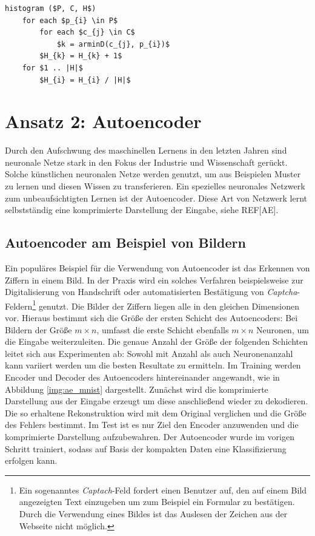 
\begin{lstlisting}[mathescape=true]
histogram ($P, C, H$)
	for each $p_{i} \in P$
		for each $c_{j} \in C$
			$k = arminD(c_{j}, p_{i})$ 
		$H_{k} = H_{k} + 1$		
	for $1 .. |H|$
		$H_{i} = H_{i} / |H|$
\end{lstlisting}

\section{Ansatz 2: Autoencoder}

Durch den Aufschwung des maschinellen Lernens in den letzten Jahren sind neuronale Netze stark in den Fokus der Industrie und Wissenschaft gerückt. Solche künstlichen neuronalen Netze werden genutzt, um aus Beispielen Muster zu lernen und diesen Wissen zu transferieren. 
Ein spezielles neuronales Netzwerk zum unbeaufsichtigten Lernen ist der Autoencoder. Diese Art von Netzwerk lernt selbstständig eine komprimierte Darstellung der Eingabe, siehe REF[AE].

\subsection{Autoencoder am Beispiel von Bildern}

Ein populäres Beispiel für die Verwendung von Autoencoder ist das Erkennen von Ziffern in einem Bild. In der Praxis wird ein solches Verfahren beispielsweise zur Digitalisierung von Handschrift oder automatisierten Bestätigung von \textit{Captcha}-Feldern\footnote{Ein sogenanntes \textit{Captach}-Feld fordert einen Benutzer auf, den auf einem Bild angezeigten Text einzugeben um zum Beispiel ein Formular zu bestätigen. Durch die Verwendung eines Bildes ist das Auslesen der Zeichen aus der Webseite nicht möglich.} genutzt.
Die Bilder der Ziffern liegen alle in den gleichen Dimensionen vor. Hieraus bestimmt sich die Größe der ersten Schicht des Autoencoders: Bei Bildern der Größe $m \times n$, umfasst die erste Schicht ebenfalls $m \times n$ Neuronen, um die Eingabe weiterzuleiten. Die genaue Anzahl der Größe der folgenden Schichten leitet sich aus Experimenten ab: Sowohl mit Anzahl als auch Neuronenanzahl kann variiert werden um die besten Resultate zu ermitteln.
Im Training werden Encoder und Decoder des Autoencoders hintereinander angewandt, wie in Abbildung \ref{img:ae_mnist} dargestellt. Zunächst wird die komprimierte Darstellung aus der Eingabe erzeugt um diese anschließend wieder zu dekodieren. Die so erhaltene Rekonstruktion wird mit dem Original verglichen und die Größe des Fehlers bestimmt.
Im Test ist es nur Ziel den Encoder anzuwenden und die komprimierte Darstellung aufzubewahren. Der Autoencoder wurde im vorigen Schritt trainiert, sodass auf Basis der kompakten Daten eine Klassifizierung erfolgen kann.

